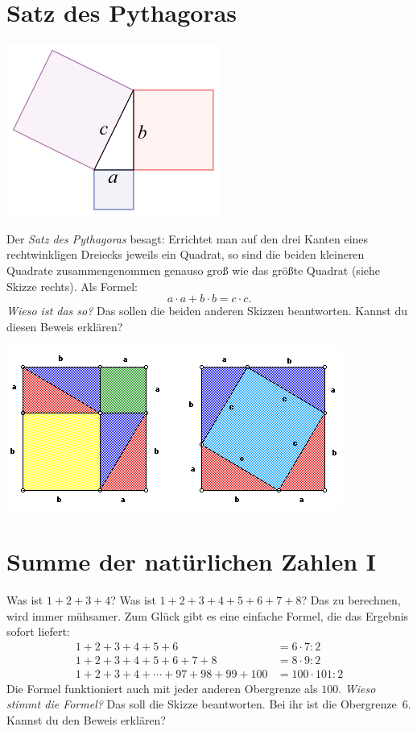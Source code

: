 \documentclass[a5paper,ngerman,landscape,11pt]{scrartcl}
\begin{document}
\section*{Satz des Pythagoras}
\begin{floatingfigure}[r]{4cm}
  \vspace{-1cm}
  \includegraphics[scale=0.5]{pythagoras-1}
\end{floatingfigure}
Der \emph{Satz des Pythagoras} besagt: Errichtet man auf den drei Kanten eines
rechtwinkligen Dreiecks jeweils ein Quadrat, so sind die beiden kleineren
Quadrate zusammengenommen genauso groß wie das größte Quadrat (siehe Skizze
rechts). Als Formel:
\[ a \cdot a + b \cdot b = c \cdot c. \]
\emph{Wieso ist das so?} Das sollen die beiden anderen Skizzen beantworten.
Kannst du diesen Beweis erklären?

\vfill
\begin{center}
\includegraphics{pythagoras-2}
\end{center}


\section*{Summe der natürlichen Zahlen I}
Was ist $1 + 2 + 3 + 4$? Was ist $1 + 2 + 3 + 4 + 5 + 6 + 7 + 8$? Das zu
berechnen, wird immer mühsamer. Zum Glück gibt es eine einfache Formel, die das
Ergebnis sofort liefert:
\begin{align*}
  1 + 2 + 3 + 4 + 5 + 6 \phantom{{} + 7 + 8} &= 6 \cdot 7 : 2 \\
  1 + 2 + 3 + 4 + 5 + 6 + 7 + 8 &= 8 \cdot 9 : 2 \\
  1 + 2 + 3 + 4 + \cdots + 97 + 98 + 99 + 100 &= 100 \cdot 101 : 2
\end{align*}
Die Formel funktioniert auch mit jeder anderen Obergrenze als $100$. \emph{Wieso
stimmt die Formel?} Das soll die Skizze beantworten. Bei ihr ist die
Obergrenze~$6$. Kannst du den Beweis erklären?
\end{document}
